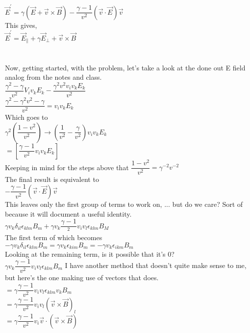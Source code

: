 \documentclass[prb,preprint]
{revtex4-1}
\newcommand{\PRLsep}{\noindent\makebox[\linewidth]{\resizebox{0.8888\linewidth}{2pt}{$\bullet$}}\bigskip}
\begin{document}
$\vec{E}^\prime = \gamma \left(\vec{E} + \vec{v} \times \vec{B}\right) - \dfrac{\gamma - 1}{v^2}\left(\vec{v} \cdot \vec{E}\right)\vec{v}$
\\
This gives,
\\
$\vec{E}^\prime = \vec{E}_\parallel + \gamma\vec{E}_\perp + \vec{v} \times \vec{B}$
\\
\\
\PRLsep
\\
Now, getting started, with the problem, let's take a look at the done out E field analog from the notes and class.
\\
$\dfrac{\gamma^2 - \gamma}{v^2}V_i v_k E_k - \dfrac{\gamma^2 v^2 v_i v_k E_k}{v^2}$
\\
$\dfrac{\gamma^2 - \gamma^2 v^2 - \gamma}{v^2} =  v_i v_k E_k$
\\
Which goes to 
\\
$\gamma^2\left(\dfrac{1 - v^2}{v^2}\right) \rightarrow \left(\dfrac{1}{v^2} - \dfrac{\gamma}{v^2}\right)v_i v_k E_k$
\\
$ = \left[\dfrac{\gamma - 1}{v^2} v_i v_k E_k\right]$
\\
Keeping in mind for the steps above that 
$\dfrac{1 - v^2}{v^2} = \gamma^{-2} v^{-2}$
\\
The final result is equivalent to 
\\
$- \dfrac{\gamma - 1}{v^2}\left(\vec{v} \cdot \vec{E}\right)\vec{v}$
\\
This leaves only the first group of terms to work on, ... but do we care?  Sort of because it will document a useful identity.
\\
$\gamma v_k \delta_{il} \epsilon_{klm} B_m + \gamma v_k \dfrac{\gamma - 1}{^2} v_i v_l \epsilon_{klm} B_M$
\\
The first term of which becomes 
\\
$-\gamma v_k \delta_{il} \epsilon_{klm} B_m = \gamma v_k \epsilon_{kim} B_m = -\gamma v_k \epsilon_{ikm} B_m$
\\
Looking at the remaining term, is it possible that it's 0?
\\
$\gamma v_k \dfrac{\gamma - 1}{v^2} v_i v_l \epsilon_{klm} B_m$
I have another method that doesn't quite make sense to me, but here's the one making use of vectors that does.
\\
$ =\gamma \dfrac{\gamma - 1}{v^2} v_i v_l \epsilon_{klm} v_k B_m$
\\
$ =\gamma \dfrac{\gamma - 1}{v^2} v_i v_l \left(\vec{v} \times \vec{B}\right)_l$
\\
$ =\gamma \dfrac{\gamma - 1}{v^2} v_i \vec{v} \cdot \left(\vec{v} \times \vec{B}\right)$
\end{document}
